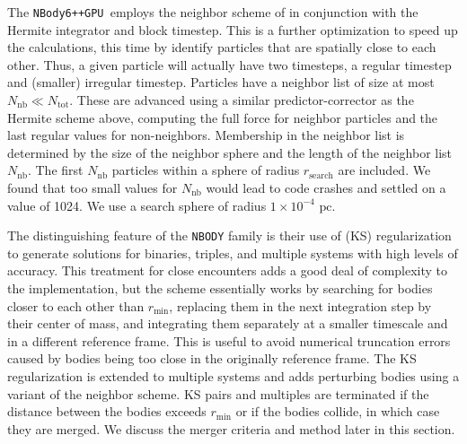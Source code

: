 \documentclass{princeton_astro_thesis}
\newcommand\pc{\mbox{ pc}}
\newcommand\nbody{\texttt{NBody6++GPU }}
\numberwithin{equation}{section}
\begin{document}
The \nbody employs the neighbor scheme of \citet{1973Ahmad} in conjunction with the Hermite integrator and block timestep. This is a further optimization to speed up the calculations, this time by identify particles that are spatially close to each other. Thus, a given particle will actually have two timesteps, a regular timestep and (smaller) irregular timestep. Particles have a neighbor list of size at most $N_{\mathrm{nb}} \ll N_{\mathrm{tot}}$.  These are advanced using a similar predictor-corrector as the Hermite scheme above, computing the full force for neighbor particles and the last regular values for non-neighbors. Membership in the neighbor list is determined by the size of the neighbor sphere and the length of the neighbor list $N_{\mathrm{nb}}$.  The first $N_{\mathrm{nb}}$ particles within a sphere of radius $r_{\mathrm{search}}$ are included.  We found that too small values for $N_{\mathrm{nb}}$ would lead to code crashes and settled on a value of 1024.  We use a search sphere of radius $1 \times 10^{-4} \pc$.

The distinguishing feature of the \texttt{NBODY} family is their use of \citet{1965Kusta} (KS) regularization to generate solutions for binaries, triples, and multiple systems with high levels of accuracy.  This treatment for close encounters adds a good deal of complexity to the implementation, but the scheme essentially works by searching for bodies closer to each other than $r_{\mathrm{min}}$, replacing them in the next integration step by their center of mass, and integrating them separately at a smaller timescale and in a different reference frame. This is useful to avoid numerical truncation errors caused by bodies being too close in the originally reference frame. The KS regularization is extended to multiple systems and adds perturbing bodies using a variant of the \citet{1973Ahmad} neighbor scheme. KS pairs and multiples are terminated if the distance between the bodies exceeds $r_{\mathrm{min}}$ or if the bodies collide, in which case they are merged.  We discuss the merger criteria and method later in this section.
\end{document}

